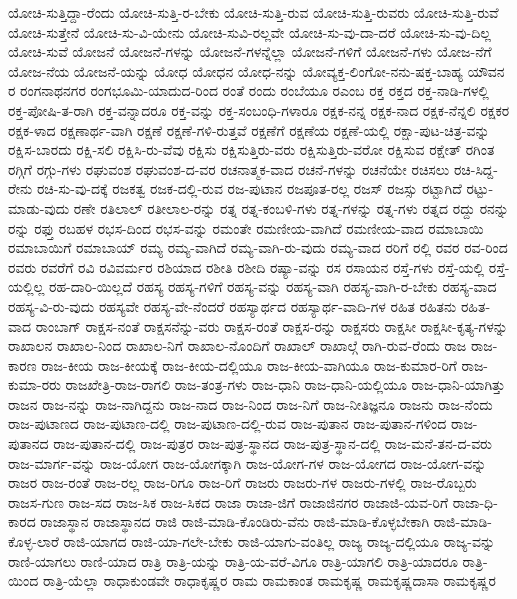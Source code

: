 {ಯೋಚಿ-ಸುತ್ತಿದ್ದಾ-ರೆಂದು
ಯೋಚಿ-ಸುತ್ತಿ-ರ-ಬೇಕು
ಯೋಚಿ-ಸುತ್ತಿ-ರುವ
ಯೋಚಿ-ಸುತ್ತಿ-ರುವರು
ಯೋಚಿ-ಸುತ್ತಿ-ರುವೆ
ಯೋಚಿ-ಸುತ್ತೇನೆ
ಯೋಚಿ-ಸು-ವಿ-ಯೇನು
ಯೋಚಿ-ಸುವಿ-ರಲ್ಲವೇ
ಯೋಚಿ-ಸು-ವು-ದಾ-ದರೆ
ಯೋಚಿ-ಸು-ವು-ದಿಲ್ಲ
ಯೋಚಿ-ಸುವೆ
ಯೋಜನೆ
ಯೋಜನೆ-ಗಳನ್ನು
ಯೋಜನೆ-ಗಳನ್ನೆಲ್ಲಾ
ಯೋಜನೆ-ಗಳಿಗೆ
ಯೋಜನೆ-ಗಳು
ಯೋಜ-ನೆಗೆ
ಯೋಜ-ನೆಯ
ಯೋಜನೆ-ಯನ್ನು
ಯೋಧ
ಯೋಧನ
ಯೋಧ-ನನ್ನು
ಯೋವ್ಯಕ್ತ-ಲಿಂಗೋ-ನನು-ಷಕ್ತ-ಬಾಹ್ಯ
ಯೌವನ
ರ
ರಂಗನಾಥನಗರ
ರಂಗಭೂಮಿ-ಯಾದುದ-ರಿಂದ
ರಂತೆ
ರಂದು
ರಂಬೆಯೂ
ರಎಂಬ
ರಕ್ತ
ರಕ್ತದ
ರಕ್ತ-ನಾಡಿ-ಗಳಲ್ಲಿ
ರಕ್ತ-ಪೋಷಿ-ತ-ರಾಗಿ
ರಕ್ತ-ವನ್ನಾದರೂ
ರಕ್ತ-ವನ್ನು
ರಕ್ತ-ಸಂಬಂಧಿ-ಗಳಾರೂ
ರಕ್ಷಕ-ನನ್ನ
ರಕ್ಷಕ-ನಾದ
ರಕ್ಷಕ-ನೆನ್ನಲಿ
ರಕ್ಷಕರ
ರಕ್ಷಕ-ಳಾದ
ರಕ್ಷಣಾರ್ಥ-ವಾಗಿ
ರಕ್ಷಣೆ
ರಕ್ಷಣೆ-ಗಳಿ-ರುತ್ತವೆ
ರಕ್ಷಣೆಗೆ
ರಕ್ಷಣೆಯ
ರಕ್ಷಣೆ-ಯಲ್ಲಿ
ರಕ್ಷಾ-ಪುಟ-ಚಿತ್ರ-ವನ್ನು
ರಕ್ಷಿಸ-ಬಾರದು
ರಕ್ಷಿ-ಸಲಿ
ರಕ್ಷಿಸಿ-ರು-ವೆವು
ರಕ್ಷಿಸು
ರಕ್ಷಿಸುತ್ತಿರು-ವರು
ರಕ್ಷಿಸುತ್ತಿರು-ವರೋ
ರಕ್ಷಿಸುವ
ರಕ್ಷೇತ್
ರಗಿಂತ
ರಗ್ಗಿಗೆ
ರಗ್ಗು-ಗಳು
ರಘುವಂಶ
ರಘುವಂಶ-ದ-ವರ
ರಚನಾತ್ಮಕ-ವಾದ
ರಚನೆ-ಗಳನ್ನು
ರಚನೆಯೇ
ರಚಿಸಲು
ರಚಿ-ಸಿದ್ದ-ರೇನು
ರಚಿ-ಸು-ವು-ದಕ್ಕೆ
ರಜಕತ್ವ
ರಜಕ-ದಲ್ಲಿ-ರುವ
ರಜ-ಪುಟಾನ
ರಜಪೂತ-ರಲ್ಲ
ರಜಸ್
ರಜಸ್ಸು
ರಟ್ಟಾಗಿದೆ
ರಟ್ಟು-ಮಾಡು-ವುದು
ರಣೇ
ರತಿಲಾಲ್
ರತೀಲಾಲ-ರನ್ನು
ರತ್ನ
ರತ್ನ-ಕಂಬಳಿ-ಗಳು
ರತ್ನ-ಗಳನ್ನು
ರತ್ನ-ಗಳು
ರತ್ನದ
ರದ್ದು
ರನನ್ನು
ರನ್ನು
ರಫ್ತು
ರಬಹಳ
ರಭಸ-ದಿಂದ
ರಭಸ-ವನ್ನು
ರಮಂತೇ
ರಮಣೀಯ-ವಾಗಿದೆ
ರಮಣೀಯ-ವಾದ
ರಮಾಬಾಯಿ
ರಮಾಬಾಯಿಗೆ
ರಮಾಬಾಯ್
ರಮ್ಯ
ರಮ್ಯ-ವಾಗಿದೆ
ರಮ್ಯ-ವಾಗಿ-ರು-ವುದು
ರಮ್ಯ-ವಾದ
ರರಿಗೆ
ರಲ್ಲಿ
ರವರ
ರವ-ರಿಂದ
ರವರು
ರವರೆಗೆ
ರವಿ
ರವಿವರ್ಮರ
ರಶಿಯಾದ
ರಶೀತಿ
ರಶೀದಿ
ರಷ್ಯಾ-ವನ್ನು
ರಸ
ರಸಾಯನ
ರಸ್ತೆ-ಗಳು
ರಸ್ತೆ-ಯಲ್ಲಿ
ರಸ್ತೆ-ಯಲ್ಲಿಲ್ಲ
ರಹ-ದಾರಿ-ಯಿಲ್ಲದೆ
ರಹಸ್ಯ
ರಹಸ್ಯ-ಗಳಿಗೆ
ರಹಸ್ಯ-ವನ್ನು
ರಹಸ್ಯ-ವಾಗಿ
ರಹಸ್ಯ-ವಾಗಿ-ರ-ಬೇಕು
ರಹಸ್ಯ-ವಾದ
ರಹಸ್ಯ-ವಿ-ರು-ವುದು
ರಹಸ್ಯವೇ
ರಹಸ್ಯ-ವೇ-ನೆಂದರೆ
ರಹಸ್ಯಾರ್ಥದ
ರಹಸ್ಯಾರ್ಥ-ವಾದಿ-ಗಳ
ರಹಿತ
ರಹಿತನು
ರಹಿತ-ವಾದ
ರಾಂಬಾಗ್
ರಾಕ್ಷಸ-ನಂತೆ
ರಾಕ್ಷಸನೆನ್ನು-ವರು
ರಾಕ್ಷಸ-ರಂತೆ
ರಾಕ್ಷಸ-ರನ್ನು
ರಾಕ್ಷಸರು
ರಾಕ್ಷಸೀ
ರಾಕ್ಷಸೀ-ಕೃತ್ಯ-ಗಳನ್ನು
ರಾಖಾಲನ
ರಾಖಾಲ-ನಿಂದ
ರಾಖಾಲ-ನಿಗೆ
ರಾಖಾಲ-ನೊಂದಿಗೆ
ರಾಖಾಲ್
ರಾಖಾಲ್ಗೆ
ರಾಗಿ-ರುವ-ರೆಂದು
ರಾಜ
ರಾಜ-ಕಾರಣ
ರಾಜ-ಕೀಯ
ರಾಜ-ಕೀಯಕ್ಕೆ
ರಾಜ-ಕೀಯ-ದಲ್ಲಿಯೂ
ರಾಜ-ಕೀಯ-ವಾಗಿಯೂ
ರಾಜ-ಕುಮಾರ-ರಿಗೆ
ರಾಜ-ಕುಮಾ-ರರು
ರಾಜಖೇತ್ರಿ-ರಾಜ-ರಾಗಲಿ
ರಾಜ-ತಂತ್ರ-ಗಳು
ರಾಜ-ಧಾನಿ
ರಾಜ-ಧಾನಿ-ಯಲ್ಲಿಯೂ
ರಾಜ-ಧಾನಿ-ಯಾಗಿತ್ತು
ರಾಜನ
ರಾಜ-ನನ್ನು
ರಾಜ-ನಾಗಿದ್ದನು
ರಾಜ-ನಾದ
ರಾಜ-ನಿಂದ
ರಾಜ-ನಿಗೆ
ರಾಜ-ನೀತಿಜ್ಞನೂ
ರಾಜನು
ರಾಜ-ನೆಂದು
ರಾಜ-ಪುಟಾಣದ
ರಾಜ-ಪುಟಾಣ-ದಲ್ಲಿ
ರಾಜ-ಪುಟಾಣ-ದಲ್ಲಿ-ರುವ
ರಾಜ-ಪುತಾನ
ರಾಜ-ಪುತಾನ-ಗಳಿಂದ
ರಾಜ-ಪುತಾನದ
ರಾಜ-ಪುತಾನ-ದಲ್ಲಿ
ರಾಜ-ಪುತ್ರರ
ರಾಜ-ಪುತ್ರ-ಸ್ಥಾನದ
ರಾಜ-ಪುತ್ರ-ಸ್ಥಾನ-ದಲ್ಲಿ
ರಾಜ-ಮನೆ-ತನ-ದ-ವರು
ರಾಜ-ಮಾರ್ಗ-ವನ್ನು
ರಾಜ-ಯೋಗ
ರಾಜ-ಯೋಗಕ್ಕಾಗಿ
ರಾಜ-ಯೋಗ-ಗಳ
ರಾಜ-ಯೋಗದ
ರಾಜ-ಯೋಗ-ವನ್ನು
ರಾಜರ
ರಾಜ-ರಂತೆ
ರಾಜ-ರಲ್ಲ
ರಾಜ-ರಿಗೂ
ರಾಜ-ರಿಗೆ
ರಾಜರು
ರಾಜರು-ಗಳ
ರಾಜರು-ಗಳಲ್ಲಿ
ರಾಜ-ರೊಬ್ಬರು
ರಾಜಸ-ಗುಣ
ರಾಜ-ಸದ
ರಾಜ-ಸಿಕ
ರಾಜ-ಸಿಕದ
ರಾಜಾ
ರಾಜಾ-ಜಿಗೆ
ರಾಜಾಜಿನಗರ
ರಾಜಾಜಿ-ಯವ-ರಿಗೆ
ರಾಜಾ-ಧಿ-ಕಾರದ
ರಾಜಾಸ್ಥಾನ
ರಾಜಾಸ್ಥಾನದ
ರಾಜಿ
ರಾಜಿ-ಮಾಡಿ-ಕೊಂಡಿರು-ವೆನು
ರಾಜಿ-ಮಾಡಿ-ಕೊಳ್ಳಬೇಕಾಗಿ
ರಾಜಿ-ಮಾಡಿ-ಕೊಳ್ಳ-ಲಾರೆ
ರಾಜಿ-ಯಾಗದ
ರಾಜಿ-ಯಾ-ಗಲೇ-ಬೇಕು
ರಾಜಿ-ಯಾಗು-ವಂತಿಲ್ಲ
ರಾಜ್ಯ
ರಾಜ್ಯ-ದಲ್ಲಿಯೂ
ರಾಜ್ಯ-ವನ್ನು
ರಾಣಿ-ಯಾಗಲು
ರಾಣಿ-ಯಾದ
ರಾತ್ರಿ
ರಾತ್ರಿ-ಯನ್ನು
ರಾತ್ರಿ-ಯ-ವರೆ-ವಿಗೂ
ರಾತ್ರಿ-ಯಾಗಲಿ
ರಾತ್ರಿ-ಯಾದರೂ
ರಾತ್ರಿ-ಯಿಂದ
ರಾತ್ರಿ-ಯೆಲ್ಲಾ
ರಾಧಾಕುಂಡವೇ
ರಾಧಾಕೃಷ್ಣರ
ರಾಮ
ರಾಮಕಾಂತ
ರಾಮಕೃಷ್ಣ
ರಾಮಕೃಷ್ಣದಾಸಾ
ರಾಮಕೃಷ್ಣರ
}
